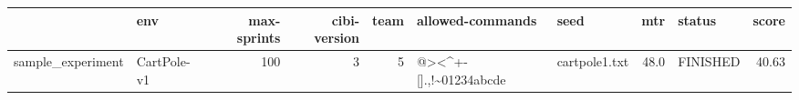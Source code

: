 \begin{tabular}{llrrrllrlr}
\toprule
{} &          env &  max-sprints &  cibi-version &  team &        allowed-commands &           seed &   mtr &    status &  score \\
\midrule
sample\_experiment &  CartPole-v1 &          100 &             3 &     5 &  @><\textasciicircum +-[].,!\textasciitilde 01234abcde &  cartpole1.txt &  48.0 &  FINISHED &  40.63 \\
\bottomrule
\end{tabular}
